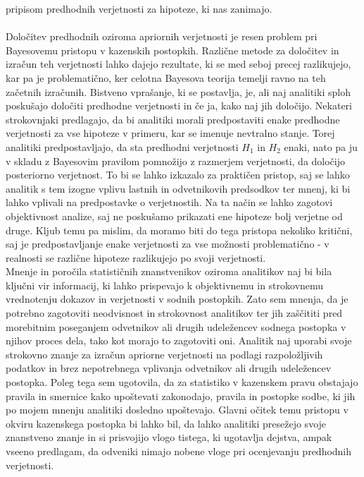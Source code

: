 \documentclass[12pt,a4paper]{amsart}
\theoremstyle{definition} %
\theoremstyle{plain} %
\begin{document}
pripisom predhodnih verjetnosti za hipoteze, ki nas zanimajo.\\\\
Določitev predhodnih oziroma apriornih verjetnosti je resen problem pri Bayesovemu pristopu v kazenskih postopkih. Različne metode za določitev in izračun teh 
verjetnosti lahko dajejo rezultate, ki se med seboj precej razlikujejo, kar pa je problematično, ker celotna Bayesova teorija temelji ravno na teh začetnih 
izračunih. Bistveno vprašanje, ki se postavlja, je, ali naj analitiki sploh poskušajo določiti predhodne verjetnosti in če ja, kako naj jih določijo. Nekateri 
strokovnjaki predlagajo, da bi analitiki morali predpostaviti enake predhodne verjetnosti za vse hipoteze v primeru, kar se imenuje nevtralno 
stanje. Torej analitiki predpostavljajo, da sta predhodni verjetnosti $H_1$ in $H_2$ enaki, nato pa 
ju v skladu z Bayesovim pravilom pomnožijo z razmerjem verjetnosti, da določijo posteriorno verjetnost. To bi se lahko izkazalo za praktičen pristop, 
saj se lahko analitik s tem izogne vplivu lastnih in odvetnikovih predsodkov ter mnenj, ki bi lahko vplivali na predpostavke o verjetnostih. Na ta način se 
lahko zagotovi objektivnost analize, saj ne poskušamo prikazati ene hipoteze bolj verjetne od druge. Kljub temu pa mislim, da moramo biti do tega 
pristopa nekoliko kritični, saj je predpostavljanje enake verjetnosti za vse možnosti problematično - v realnosti se različne hipoteze razlikujejo po svoji 
verjetnosti.\\
Mnenje in poročila statističnih znanstvenikov oziroma analitikov naj bi bila ključni vir informacij, ki lahko prispevajo k objektivnemu in strokovnemu 
vrednotenju dokazov in verjetnosti v sodnih postopkih. Zato sem mnenja, da je potrebno zagotoviti neodvisnost in strokovnost analitikov ter jih 
zaščititi pred morebitnim poseganjem odvetnikov ali drugih udeležencev sodnega postopka v njihov proces dela, tako kot morajo to zagotoviti oni. Analitik naj uporabi svoje strokovno znanje za izračun apriorne verjetnosti na podlagi razpoložljivih podatkov in brez nepotrebnega 
vplivanja odvetnikov ali drugih udeležencev postopka. Poleg tega sem ugotovila, da za statistiko v kazenskem pravu obstajajo pravila in smernice kako upoštevati zakonodajo, pravila 
in postopke sodbe, ki jih po mojem mnenju analitiki dosledno upoštevajo. Glavni očitek temu pristopu v okviru kazenskega postopka bi lahko bil, da lahko analitiki presežejo svoje znanstveno 
znanje in si prisvojijo vlogo tistega, ki ugotavlja dejstva, ampak vseeno predlagam, da odveniki nimajo nobene vloge pri ocenjevanju predhodnih verjetnosti.\\\\
\end{document}
